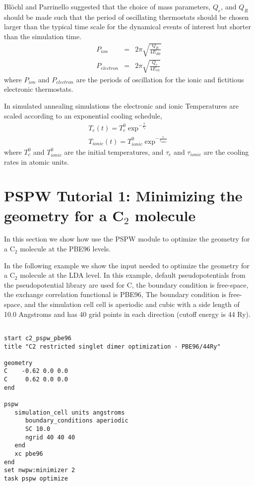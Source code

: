 Bl\"{o}chl and Parrinello suggested that the choice of mass parameters, 
$Q_e$, and $Q_R$ should be made such that the period of oscillating thermostats 
should be chosen larger than the typical time scale for the dynamical events of 
interest but shorter than the simulation time.  
\begin{eqnarray}
P_{ion} &=& 2\pi \sqrt{\frac{Q_R}{4E_{R0}}}\\
P_{electron} &=& 2\pi \sqrt{\frac{Q_e}{4E_{e0}}}
\end{eqnarray}
where $P_{ion}$ and $P_{electron}$ are the periods of oscillation for the ionic and fictitious
electronic thermostats.  


In simulated annealing simulations the electronic and ionic Temperatures are scaled 
according to an exponential cooling schedule,
\begin{eqnarray}
T_e(t) = T_e^0 \exp^{-\frac{t}{\tau_e}}\\
T_{ionic}(t) = T_{ionic}^0 \exp^{-\frac{t}{\tau_{ionic}}}
\end{eqnarray}
where $T_e^0$ and $T_{ionic}^0$ are the initial temperatures, and $\tau_e$ and $\tau_{ionic}$
are the cooling rates in atomic units.  



\section{PSPW Tutorial 1: Minimizing the geometry for a C$_2$ molecule}
\label{sec:pspw_sd}

In this section we show how use the PSPW module to optimize the geometry 
for a C$_2$ molecule at the PBE96 levels. 

In the following example we show the input needed to optimize the geometry
for a C$_2$ molecule at the LDA level.  In this example, default pseudopotentials
from the pseudopotential library are used for C, the boundary condition is free-space, 
the exchange correlation functional is PBE96, The boundary condition is free-space, and 
the simulation cell cell is aperiodic and cubic with a side length of 10.0 Angstroms and has
40 grid points in each direction (cutoff energy is 44 Ry).  
\begin{verbatim}
         
start c2_pspw_pbe96
title "C2 restricted singlet dimer optimization - PBE96/44Ry"

geometry  
C    -0.62 0.0 0.0
C     0.62 0.0 0.0
end
       
pspw
   simulation_cell units angstroms
      boundary_conditions aperiodic
      SC 10.0
      ngrid 40 40 40
   end
   xc pbe96
end
set nwpw:minimizer 2
task pspw optimize
\end{verbatim}



